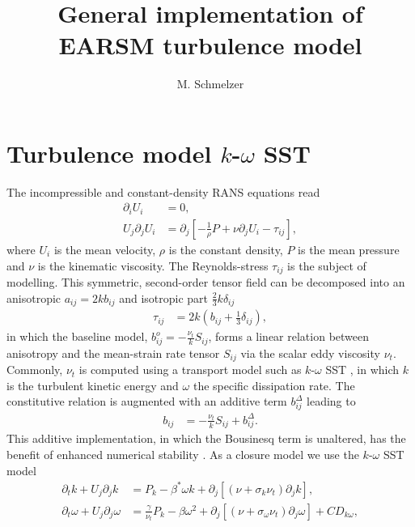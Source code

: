 \documentclass[10pt,a4paper,twoside]{article}
\title{General implementation of EARSM turbulence model}
\author{M. Schmelzer}
\newcommand{\tauij}{\tau_{ij}}
\newcommand{\aij}{a_{ij}}
\newcommand{\bij}{b_{ij}}
\newcommand{\Sij}{S_{ij}}
\newcommand{\komegasst}{$k$-$\omega$ SST}
\newcommand{\bdelta}{b^\Delta_{ij}}
\begin{document}
\maketitle

\section{Turbulence model \komegasst}

The incompressible and constant-density RANS equations read
\begin{align}
	\partial_i U_i &= 0, \nonumber \\
	U_j \partial_j U_i &= \partial_j \left[ -\frac{1}{\rho} P + \nu \partial_j U_i - \tauij \right],
\end{align}
\noindent where $U_i$ is the mean velocity, $\rho$ is the constant density, $P$ is the mean pressure and $\nu$ is the kinematic viscosity. The Reynolds-stress $\tauij$ is the subject of modelling. This symmetric, second-order tensor field can be decomposed into an anisotropic $\aij = 2k\bij$ and isotropic part $\frac{2}{3} k \delta_{ij}$
\begin{align}
	\tauij &= 2k \left( \bij  + \frac{1}{3} \delta_{ij} \right), \label{eq::reynoldsstress}
\end{align}
\noindent in which the baseline model, $\bij^o = -\frac{\nu_t}{k} S_{ij}$, forms a linear relation between anisotropy and the mean-strain rate tensor $\Sij$ via the scalar eddy viscosity $\nu_t$. Commonly, $\nu_t$ is computed using a transport model such as \komegasst{} \cite{Leschziner2015}, in which $k$ is the turbulent kinetic energy and $\omega$ the specific dissipation rate. The constitutive relation is augmented with an additive term $\bdelta$ leading to 
\begin{align}
	\bij   &= -\frac{\nu_t}{k} S_{ij} + \bdelta.\label{eq::nonlinearconstrel}
\end{align}
This additive implementation, in which the Bousinesq term is unaltered, has the benefit of enhanced numerical stability \cite{Weatheritt2017}. As a closure model we use the \komegasst{} model
\begin{align}
	\partial_t k + U_j \partial_j k &= P_k - \beta^* \omega k + \partial_j \left[ (\nu + \sigma_k \nu_t) \partial_j k \right],\label{eq::augmentedkeq} \\
	\partial_t \omega + U_j \partial_j \omega &= \frac{\gamma}{\nu_t} P_k - \beta \omega^2 + \partial_j \left[ (\nu + \sigma_\omega \nu_t) \partial_j \omega \right] + CD_{k\omega},
	 \label{eq::augmentedkOmegaSST}
\end{align}
\end{document}
